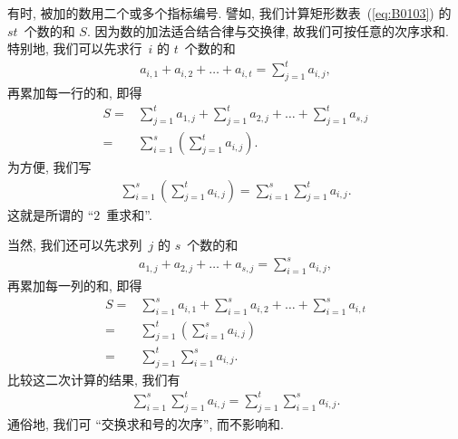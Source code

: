 \documentclass[%
    UTF8,%
    fontset=none,%
    punct=kaiming,%
    zihao=-4,%
    a4paper,%
    oneside,%
]{ctexbook}
\begin{document}
有时, 被加的数用二个或多个指标编号.
譬如, 我们计算矩形数表~(\ref{eq:B0103}) 的 \(st\)~个数的和 \(S\).
因为数的加法适合结合律与交换律,
故我们可按任意的次序求和.
特别地, 我们可以先求行~\(i\) 的 \(t\)~个数的和
\begin{align*}
    a_{i,1} + a_{i,2} + \dots + a_{i,t}
    = \sum_{j = 1}^{t} {a_{i,j}},
\end{align*}
再累加每一行的和, 即得
\begin{align*}
    S
    = {} & \sum_{j = 1}^{t} {a_{1,j}}
    + \sum_{j = 1}^{t} {a_{2,j}}
    + \dots
    + \sum_{j = 1}^{t} {a_{s,j}}
    \\
    = {} &
    \sum_{i = 1}^{s}
    {\left( \sum_{j = 1}^{t} a_{i,j} \right)}.
\end{align*}
为方便, 我们写
\begin{align*}
    \sum_{i = 1}^{s}
    {\left( \sum_{j = 1}^{t} a_{i,j} \right)}
    = \sum_{i = 1}^{s}
    {\sum_{j = 1}^{t} {a_{i,j}}}.
\end{align*}
这就是所谓的 ``\(2\)~重求和''.

当然, 我们还可以先求列~\(j\) 的 \(s\)~个数的和
\begin{align*}
    a_{1,j} + a_{2,j} + \dots + a_{s,j}
    = \sum_{i = 1}^{s} {a_{i,j}},
\end{align*}
再累加每一列的和, 即得
\begin{align*}
    S
    = {} & \sum_{i = 1}^{s} {a_{i,1}}
    + \sum_{i = 1}^{s} {a_{i,2}}
    + \dots
    + \sum_{i = 1}^{s} {a_{i,t}}
    \\
    = {} &
    \sum_{j = 1}^{t}
    {\left( \sum_{i = 1}^{s} {a_{i,j}} \right)}
    \\
    = {} &
    \sum_{j = 1}^{t} {
    \sum_{i = 1}^{s} {a_{i,j}}}.
\end{align*}
比较这二次计算的结果, 我们有
\begin{align*}
    \sum_{i = 1}^{s} {\sum_{j = 1}^{t} {a_{i,j}}}
    = \sum_{j = 1}^{t} {\sum_{i = 1}^{s} {a_{i,j}}}.
\end{align*}
通俗地, 我们可 ``交换求和号的次序'', 而不影响和.
\end{document}
